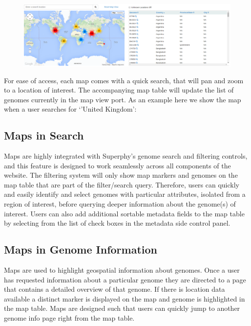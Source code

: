 \documentclass{bmcart}
\begin{document}
\newpage
\begin{figure}[htbp]
    \includegraphics[width=\textwidth]{images/map.png}
\end{figure}


For ease of access, each map comes with a quick search, that will pan and zoom to a location of interest. The accompanying map table will update the list of genomes currently in the map view port. As an example here we show the map when a user searches for `'United Kingdom':



\subsection{Maps in Search}
Maps are highly integrated with Superphy's genome search and filtering controls, and this feature is designed to work seamlessly across all components of the website. The filtering system will only show map markers and genomes on the map table that are part of the filter/search query. Therefore, users can quickly and easily identify and select genomes with particular attributes, isolated from a region of interest, before querying deeper information about the genome(s) of interest. Users can also add additional sortable metadata fields to the map table by selecting from the list of check boxes in the metadata side control panel. 
\pagebreak

\subsection{Maps in Genome Information}
Maps are used to highlight geospatial information about genomes. Once a user has requested information about a particular genome they are directed to a page that contains a detailed overview of that genome. If there is location data available a distinct marker is displayed on the map and genome is highlighted in the map table. Maps are designed such that users can quickly jump to another genome info page right from the map table.

\end{document}
